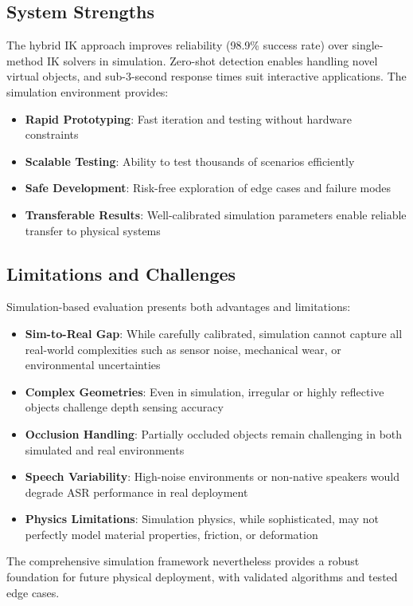 \documentclass[conference]{IEEEtran}
\begin{document}
\subsection{System Strengths}
The hybrid IK approach improves reliability (98.9\% success rate) over single-method IK solvers in simulation. Zero-shot detection enables handling novel virtual objects, and sub-3-second response times suit interactive applications. The simulation environment provides:
\begin{itemize}
    \item \textbf{Rapid Prototyping}: Fast iteration and testing without hardware constraints
    \item \textbf{Scalable Testing}: Ability to test thousands of scenarios efficiently
    \item \textbf{Safe Development}: Risk-free exploration of edge cases and failure modes
    \item \textbf{Transferable Results}: Well-calibrated simulation parameters enable reliable transfer to physical systems
\end{itemize}

\subsection{Limitations and Challenges}
Simulation-based evaluation presents both advantages and limitations:
\begin{itemize}
    \item \textbf{Sim-to-Real Gap}: While carefully calibrated, simulation cannot capture all real-world complexities such as sensor noise, mechanical wear, or environmental uncertainties
    \item \textbf{Complex Geometries}: Even in simulation, irregular or highly reflective objects challenge depth sensing accuracy
    \item \textbf{Occlusion Handling}: Partially occluded objects remain challenging in both simulated and real environments
    \item \textbf{Speech Variability}: High-noise environments or non-native speakers would degrade ASR performance in real deployment
    \item \textbf{Physics Limitations}: Simulation physics, while sophisticated, may not perfectly model material properties, friction, or deformation
\end{itemize}

The comprehensive simulation framework nevertheless provides a robust foundation for future physical deployment, with validated algorithms and tested edge cases.
\end{document}
